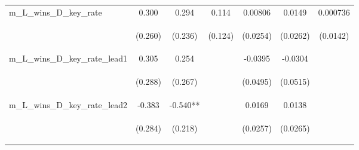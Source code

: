 \documentclass[]{article}
\begin{document}
\begin{center}
\begin{tabular}{lcccccc}
m\_L\_wins\_D\_key\_rate & 0.300 & 0.294 & 0.114 & 0.00806 & 0.0149 & 0.000736 \\
\vspace{4pt} & \begin{footnotesize}(0.260)\end{footnotesize} & \begin{footnotesize}(0.236)\end{footnotesize} & \begin{footnotesize}(0.124)\end{footnotesize} & \begin{footnotesize}(0.0254)\end{footnotesize} & \begin{footnotesize}(0.0262)\end{footnotesize} & \begin{footnotesize}(0.0142)\end{footnotesize} \\
m\_L\_wins\_D\_key\_rate\_lead1 & 0.305 & 0.254 &  & -0.0395 & -0.0304 &  \\
\vspace{4pt} & \begin{footnotesize}(0.288)\end{footnotesize} & \begin{footnotesize}(0.267)\end{footnotesize} & \begin{footnotesize}\end{footnotesize} & \begin{footnotesize}(0.0495)\end{footnotesize} & \begin{footnotesize}(0.0515)\end{footnotesize} & \begin{footnotesize}\end{footnotesize} \\
m\_L\_wins\_D\_key\_rate\_lead2 & -0.383 & -0.540** &  & 0.0169 & 0.0138 &  \\
\vspace{4pt} & \begin{footnotesize}(0.284)\end{footnotesize} & \begin{footnotesize}(0.218)\end{footnotesize} & \begin{footnotesize}\end{footnotesize} & \begin{footnotesize}(0.0257)\end{footnotesize} & \begin{footnotesize}(0.0265)\end{footnotesize} & \begin{footnotesize}\end{footnotesize} \\

\end{tabular}
\end{center}
\end{document}
